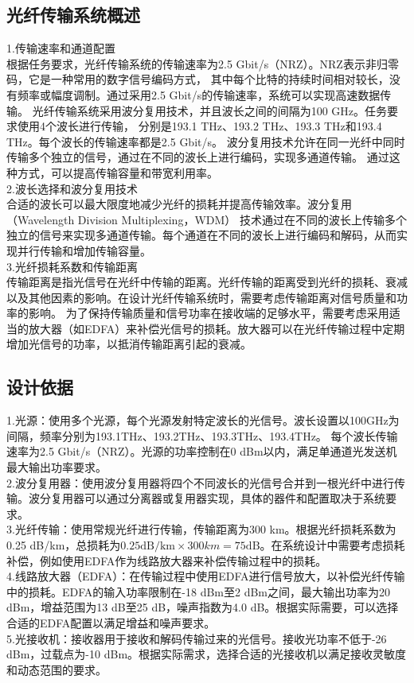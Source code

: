 \documentclass[12pt, a4paper, oneside]{article}
\begin{document}
\begin{spacing}{2.0}
\subsection{光纤传输系统概述}
1.传输速率和通道配置\\
根据任务要求，光纤传输系统的传输速率为2.5 Gbit/s（NRZ）。NRZ表示非归零码，它是一种常用的数字信号编码方式，
其中每个比特的持续时间相对较长，没有频率或幅度调制。通过采用2.5 Gbit/s的传输速率，系统可以实现高速数据传输。
光纤传输系统采用波分复用技术，并且波长之间的间隔为100 GHz。任务要求使用4个波长进行传输，
分别是193.1 THz、193.2 THz、193.3 THz和193.4 THz。每个波长的传输速率都是2.5 Gbit/s。
波分复用技术允许在同一光纤中同时传输多个独立的信号，通过在不同的波长上进行编码，实现多通道传输。
通过这种方式，可以提高传输容量和带宽利用率。\\
2.波长选择和波分复用技术\\
合适的波长可以最大限度地减少光纤的损耗并提高传输效率。波分复用（Wavelength Division Multiplexing，WDM）
技术通过在不同的波长上传输多个独立的信号来实现多通道传输。每个通道在不同的波长上进行编码和解码，从而实现并行传输和增加传输容量。\\
3.光纤损耗系数和传输距离\\
传输距离是指光信号在光纤中传输的距离。光纤传输的距离受到光纤的损耗、衰减以及其他因素的影响。在设计光纤传输系统时，需要考虑传输距离对信号质量和功率的影响。
为了保持传输质量和信号功率在接收端的足够水平，需要考虑采用适当的放大器（如EDFA）来补偿光信号的损耗。放大器可以在光纤传输过程中定期增加光信号的功率，以抵消传输距离引起的衰减。
\subsection{设计依据}
1.光源：使用多个光源，每个光源发射特定波长的光信号。波长设置以100GHz为间隔，频率分别为193.1THz、193.2THz、193.3THz、193.4THz。
每个波长传输速率为2.5 Gbit/s（NRZ）。光源的功率控制在0 dBm以内，满足单通道光发送机最大输出功率要求。
\\
2.波分复用器：使用波分复用器将四个不同波长的光信号合并到一根光纤中进行传输。波分复用器可以通过分离器或复用器实现，具体的器件和配置取决于系统要求。
\\
3.光纤传输：使用常规光纤进行传输，传输距离为300 km。根据光纤损耗系数为0.25 dB/km，总损耗为$0.25 \mathrm{dB/km} \times 300 km = 75\mathrm{dB}$。在系统设计中需要考虑损耗补偿，例如使用EDFA作为线路放大器来补偿传输过程中的损耗。
\\
4.线路放大器（EDFA）：在传输过程中使用EDFA进行信号放大，以补偿光纤传输中的损耗。EDFA的输入功率限制在-18 dBm至2 dBm之间，最大输出功率为20 dBm，增益范围为13 dB至25 dB，噪声指数为4.0 dB。根据实际需要，可以选择合适的EDFA配置以满足增益和噪声要求。
\\
5.光接收机：接收器用于接收和解码传输过来的光信号。接收光功率不低于-26 dBm，过载点为-10 dBm。根据实际需求，选择合适的光接收机以满足接收灵敏度和动态范围的要求。



\end{spacing}
\end{document}
